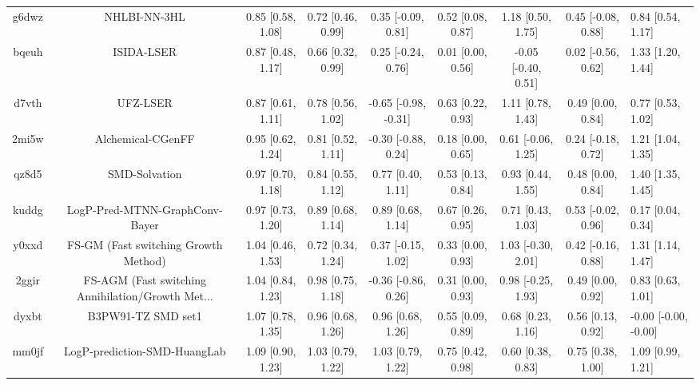 \documentclass{article}
\begin{document}
\begin{center}
\begin{longtable}{|cccccccc|}
 g6dwz &                                       NHLBI-NN-3HL &  0.85 [0.58, 1.08] &  0.72 [0.46, 0.99] &    0.35 [-0.09, 0.81] &  0.52 [0.08, 0.87] &    1.18 [0.50, 1.75] &   0.45 [-0.08, 0.88] &     0.84 [0.54, 1.17] \\
 bqeuh &                                         ISIDA-LSER &  0.87 [0.48, 1.17] &  0.66 [0.32, 0.99] &    0.25 [-0.24, 0.76] &  0.01 [0.00, 0.56] &  -0.05 [-0.40, 0.51] &   0.02 [-0.56, 0.62] &     1.33 [1.20, 1.44] \\
 d7vth &                                           UFZ-LSER &  0.87 [0.61, 1.11] &  0.78 [0.56, 1.02] &  -0.65 [-0.98, -0.31] &  0.63 [0.22, 0.93] &    1.11 [0.78, 1.43] &    0.49 [0.00, 0.84] &     0.77 [0.53, 1.02] \\
 2mi5w &                                  Alchemical-CGenFF &  0.95 [0.62, 1.24] &  0.81 [0.52, 1.11] &   -0.30 [-0.88, 0.24] &  0.18 [0.00, 0.65] &   0.61 [-0.06, 1.25] &   0.24 [-0.18, 0.72] &     1.21 [1.04, 1.35] \\
 qz8d5 &                                      SMD-Solvation &  0.97 [0.70, 1.18] &  0.84 [0.55, 1.12] &     0.77 [0.40, 1.11] &  0.53 [0.13, 0.84] &    0.93 [0.44, 1.55] &    0.48 [0.00, 0.84] &     1.40 [1.35, 1.45] \\
 kuddg &                     LogP-Pred-MTNN-GraphConv-Bayer &  0.97 [0.73, 1.20] &  0.89 [0.68, 1.14] &     0.89 [0.68, 1.14] &  0.67 [0.26, 0.95] &    0.71 [0.43, 1.03] &   0.53 [-0.02, 0.96] &     0.17 [0.04, 0.34] \\
 y0xxd &               FS-GM (Fast switching Growth Method) &  1.04 [0.46, 1.53] &  0.72 [0.34, 1.24] &    0.37 [-0.15, 1.02] &  0.33 [0.00, 0.93] &   1.03 [-0.30, 2.01] &   0.42 [-0.16, 0.88] &     1.31 [1.14, 1.47] \\
 2ggir &  FS-AGM (Fast switching Annihilation/Growth Met... &  1.04 [0.84, 1.23] &  0.98 [0.75, 1.18] &   -0.36 [-0.86, 0.26] &  0.31 [0.00, 0.93] &   0.98 [-0.25, 1.93] &    0.49 [0.00, 0.92] &     0.83 [0.63, 1.01] \\
 dyxbt &                                 B3PW91-TZ SMD set1 &  1.07 [0.78, 1.35] &  0.96 [0.68, 1.26] &     0.96 [0.68, 1.26] &  0.55 [0.09, 0.89] &    0.68 [0.23, 1.16] &    0.56 [0.13, 0.92] &  -0.00 [-0.00, -0.00] \\
 mm0jf &                       LogP-prediction-SMD-HuangLab &  1.09 [0.90, 1.23] &  1.03 [0.79, 1.22] &     1.03 [0.79, 1.22] &  0.75 [0.42, 0.98] &    0.60 [0.38, 0.83] &    0.75 [0.38, 1.00] &     1.09 [0.99, 1.21] \\

\end{longtable}
\end{center}
\end{document}
